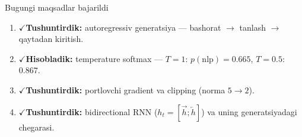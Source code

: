 \documentclass[aspectratio=169,11pt]{beamer}
\newcommand{\bajarildi}{{\color{deepgreen}\large$\checkmark$}\;}
\begin{document}
\begin{frame}{Bugungi maqsadlar bajarildi}
  \begin{enumerate}\setlength\itemsep{7pt}
    \item \bajarildi \textbf{Tushuntirdik:} autoregressiv generatsiya ---
          bashorat $\to$ tanlash $\to$ qaytadan kiritish.
    \item \bajarildi \textbf{Hisobladik:} temperature softmax ---
          $T{=}1$: $p(\text{nlp}){=}0.665$, $T{=}0.5$: $0.867$.
    \item \bajarildi \textbf{Tushuntirdik:} portlovchi gradient va clipping
          (norma $5\to 2$).
    \item \bajarildi \textbf{Tushuntirdik:} bidirectional RNN ($h_t=[\overrightarrow{h};\overleftarrow{h}]$)
          va uning generatsiyadagi chegarasi.
  \end{enumerate}
\end{frame}
\end{document}
